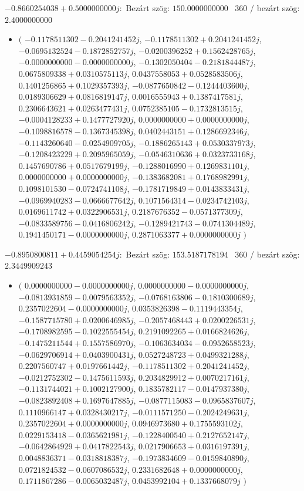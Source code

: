 \documentclass[14pt,a4paper]{article}
\begin{document}
$-0.8660254038+0.5000000000j$:\
Bezárt szög: $150.0000000000$ \
360 / bezárt szög: $2.4000000000$\
\begin{itemize}
\item
$\big($
$-0.1178511302-0.2041241452j$, $-0.1178511302+0.2041241452j$, $-0.0695132524-0.1872852757j$, $-0.0200396252+0.1562428765j$, $-0.0000000000-0.0000000000j$, $-0.1302050404-0.2181844487j$, $0.0675809338+0.0310575113j$, $0.0437558053+0.0528583506j$, $0.1401256865+0.1029357393j$, $-0.0877650842-0.1244403600j$, $0.0189306629+0.0816819147j$, $0.0016555943+0.1387417581j$, $0.2306643621+0.0263477431j$, $0.0752385105-0.1732813515j$, $-0.0004128233+0.1477727920j$, $0.0000000000+0.0000000000j$, $-0.1098816578-0.1367345398j$, $0.0402443151+0.1286692346j$, $-0.1143260640-0.0254909705j$, $-0.1886265143+0.0530337973j$, $-0.1208423229+0.2095965059j$, $-0.0546310636+0.0323733168j$, $0.1457690786+0.0517679199j$, $-0.1288016990+0.1269831101j$, $0.0000000000+0.0000000000j$, $-0.1383682081+0.1768982991j$, $0.1098101530-0.0724741108j$, $-0.1781719849+0.0143833431j$, $-0.0969940283-0.0666677642j$, $0.1071564314-0.0234742103j$, $0.0169611742+0.0322906531j$, $0.2187676352-0.0571377309j$, $-0.0833589756-0.0416806242j$, $-0.1289421743-0.0741304489j$, $0.1941450171-0.0000000000j$, $0.2871063377+0.0000000000j$
$\big)$
\end{itemize}
$-0.8950800811+0.4459054254j$:\
Bezárt szög: $153.5187178194$ \
360 / bezárt szög: $2.3449909243$\
\begin{itemize}
\item
$\big($
$0.0000000000-0.0000000000j$, $0.0000000000-0.0000000000j$, $-0.0813931859-0.0079563352j$, $-0.0768163806-0.1810300689j$, $0.2357022604-0.0000000000j$, $0.0353826398-0.1119443354j$, $-0.1587715780+0.0200646985j$, $-0.2057468443+0.0200226531j$, $-0.1708982595-0.1022555454j$, $0.2191092265+0.0166824626j$, $-0.1475211544+0.1557586970j$, $-0.1063634034-0.0952658523j$, $-0.0629706914+0.0403900431j$, $0.0527248723+0.0499321288j$, $0.2207560747+0.0197661442j$, $-0.1178511302+0.2041241452j$, $-0.0212752302-0.1475611593j$, $0.2034829912+0.0070217161j$, $-0.1131744021+0.1002127900j$, $0.1835782117-0.0147937380j$, $-0.0823892408+0.1697647885j$, $-0.0877115083-0.0965837607j$, $0.1110966147+0.0328430217j$, $-0.0111571250-0.2024249631j$, $0.2357022604+0.0000000000j$, $0.0946973680+0.1755593102j$, $0.0229153418-0.0365621981j$, $-0.1228400540+0.2127652147j$, $-0.0642864929+0.0417822543j$, $0.0217906653+0.0316197391j$, $0.0048836371-0.0318818387j$, $-0.1973834609-0.0159840890j$, $0.0721824532-0.0607086532j$, $0.2331682648+0.0000000000j$, $0.1711867286-0.0065032487j$, $0.0453992104+0.1337668079j$
$\big)$
\end{itemize}
\end{document}
